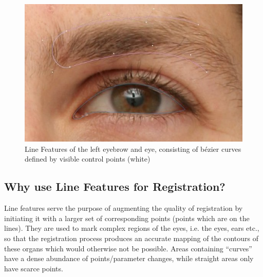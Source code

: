 \begin{figure}[h!]
    \centering
\includegraphics[width=\textwidth]{./resources/img/eyebrow_left.jpeg}
\caption{Line Features of the left eyebrow and eye, consisting of b\'{e}zier curves defined by visible control points (white)}
\end{figure}
\subsection{Why use Line Features for Registration?} 
Line features serve the purpose of augmenting the quality of registration by initiating it with a larger set of corresponding points (points which are on the lines). They are used to mark complex regions of the eyes, i.e. the eyes, ears etc., so that the registration process produces an accurate mapping of the contours of these organs which would otherwise not be possible.  Areas containing ``curves'' have a dense abundance of points/parameter changes, while straight areas only have scarce points.  

